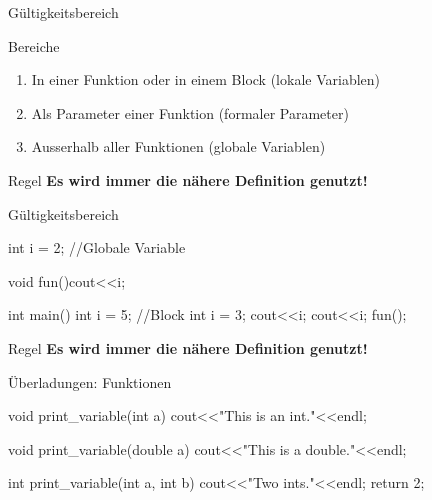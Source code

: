 \ifnum\conditionmacro=1 \documentclass[handout,usenames,dvipsnames]{beamer}\fi
\begin{document}

\begin{frame}{Gültigkeitsbereich}
\begin{block}{Bereiche}
\begin{enumerate}
\item In einer Funktion oder in einem Block (lokale Variablen)
\item Als Parameter einer Funktion (formaler Parameter)
\item Ausserhalb aller Funktionen (globale Variablen)
\end{enumerate}
\end{block}
\begin{block}{Regel}
\textbf{Es wird immer die nähere Definition genutzt!}
\end{block}
\end{frame}

\begin{frame}[fragile]{Gültigkeitsbereich}
\small
\begin{TPCpp}
int i = 2; //Globale Variable

void fun(){cout<<i;}

int main(){
	int i = 5;
	{ //Block
		int i = 3;
		cout<<i;
	}
	cout<<i;
	fun();
}
\end{TPCpp}
\normalsize

\begin{block}{Regel}
\textbf{Es wird immer die nähere Definition genutzt!}
\end{block}
\end{frame}

\begin{frame}[fragile]{Überladungen: Funktionen}
\begin{TFCpp}
void print_variable(int a){
	cout<<"This is an int."<<endl;
}

void print_variable(double a){
	cout<<"This is a double."<<endl;
}

int print_variable(int a, int b){
	cout<<"Two ints."<<endl;
	return 2;
}
\end{TFCpp}
\end{frame}
\end{document}
